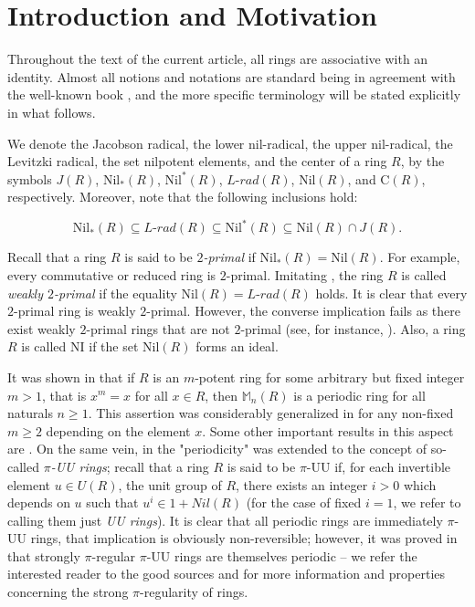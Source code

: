\documentclass[12pt]{amsart}
\theoremstyle{definition}
\theoremstyle{remark}
\numberwithin{equation}{section}
\begin{document}
\section*{Introduction and Motivation}\label{IntroductionAndMotivation}

Throughout the text of the current article, all rings are associative with an identity. Almost all notions and notations are standard being in agreement with the well-known book \cite{L}, and the more specific terminology will be stated explicitly in what follows.

We denote the Jacobson radical, the lower nil-radical, the upper nil-radical, the Levitzki radical, the set nilpotent elements, and the center of a ring $R$,  by the symbols $J(R)$, $\mathrm{Nil}_*(R)$, $\mathrm{Nil}^*(R)$, $L\text{-}rad(R)$, $\mathrm{Nil}(R)$, and $\mathrm{C}(R)$, respectively. Moreover, note that the following inclusions hold:

\[\mathrm{Nil}_*(R)\subseteq L\text{-}rad(R)\subseteq \mathrm{Nil}^*(R)\subseteq \mathrm{Nil}(R)\cap J(R).\]

\medskip

Recall that a ring $R$ is said to be {\it $2$-primal} if $\mathrm{Nil}_*(R)=\mathrm{Nil}(R)$. For example, every commutative or reduced ring is $2$-primal. Imitating \cite{wei-xing}, the ring $R$ is called {\it weakly $2$-primal} if the equality $\mathrm{Nil}(R)=L\text{-}rad(R)$ holds. It is clear that every $2$-primal ring is weakly $2$-primal. However, the converse implication fails as there exist weakly $2$-primal rings that are not $2$-primal (see, for instance, \cite[Example 2.2]{Marks}). Also, a ring $R$ is called $\mathrm{NI}$ if the set $\mathrm{Nil}(R)$ forms an ideal.

It was shown in \cite[Lemma 3.12]{BMA} that if $R$ is an $m$-potent ring for some arbitrary but fixed integer $m>1$, that is $x^m=x$ for all $x\in R$, then $\mathbb{M}_n(R)$ is a periodic ring for all naturals $n\geq 1$. This assertion was considerably generalized in \cite[Corollary 2.22]{BCL} for any non-fixed $m\geq 2$ depending on the element $x$. Some other important results in this aspect are \cite[Proposition 2.18, Theorem 2.19, Theorem 2.21]{BCL}. On the same vein, in \cite{D1} the "periodicity" was extended to the concept of so-called {\it $\pi$-UU rings}; recall that a ring $R$ is said to be $\pi$-UU if, for each invertible element $u\in U(R)$, the unit group of $R$, there exists an integer $i>0$ which depends on $u$ such that $u^i\in 1+Nil(R)$ (for the case of fixed $i=1$, we refer to \cite{DL} calling them just {\it UU rings}). It is clear that all periodic rings are immediately $\pi$-UU rings, that implication is obviously non-reversible; however, it was proved in \cite[Theorem 3.4 (7)]{CD} that strongly $\pi$-regular $\pi$-UU rings are themselves periodic -- we refer the interested reader to the good sources \cite{G} and \cite{T} for more information and properties concerning the strong $\pi$-regularity of rings.
\end{document}
